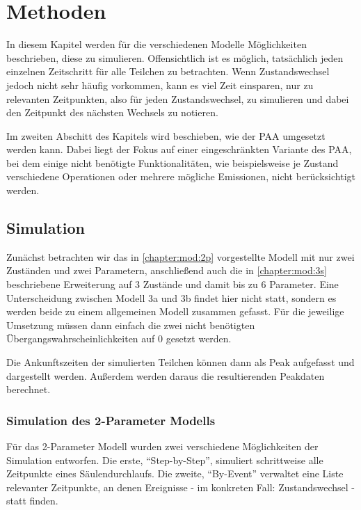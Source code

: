 \chapter{Methoden} 
\label{chapter:meth}

In diesem Kapitel werden für die verschiedenen Modelle Möglichkeiten beschrieben, diese zu simulieren. Offensichtlich ist es möglich, tatsächlich jeden einzelnen Zeitschritt für alle Teilchen zu betrachten. Wenn Zustandswechsel jedoch nicht sehr häufig vorkommen, kann es viel Zeit einsparen, nur zu relevanten Zeitpunkten, also für jeden Zustandswechsel, zu simulieren und dabei den Zeitpunkt des nächsten Wechsels zu notieren.

Im zweiten Abschitt des Kapitels wird beschieben, wie der PAA umgesetzt werden kann. Dabei liegt der Fokus auf einer eingeschränkten Variante des PAA, bei dem einige nicht benötigte Funktionalitäten, wie beispielsweise je Zustand verschiedene Operationen oder mehrere mögliche Emissionen, nicht berücksichtigt werden.

\section{Simulation}
Zunächst betrachten wir das in \ref{chapter:mod:2p} vorgestellte Modell mit nur zwei Zuständen und zwei Parametern, anschließend auch die in \ref{chapter:mod:3s} beschriebene Erweiterung auf 3 Zustände und damit bis zu 6 Parameter. Eine Unterscheidung zwischen Modell 3a und 3b findet hier nicht statt, sondern es werden beide zu einem allgemeinen Modell zusammen gefasst. Für die jeweilige Umsetzung müssen dann einfach die zwei nicht benötigten Übergangswahrscheinlichkeiten auf $0$ gesetzt werden.

Die Ankunftszeiten der simulierten Teilchen können dann als Peak aufgefasst und dargestellt werden. Außerdem werden daraus die resultierenden Peakdaten berechnet.

\subsection{Simulation des 2-Parameter Modells}
Für das 2-Parameter Modell wurden zwei verschiedene Möglichkeiten der Simulation entworfen. Die erste, ``Step-by-Step'', simuliert schrittweise alle Zeitpunkte eines Säulendurchlaufs. Die zweite, ``By-Event'' verwaltet eine Liste relevanter Zeitpunkte, an denen Ereignisse - im konkreten Fall: Zustandswechsel - statt finden.

